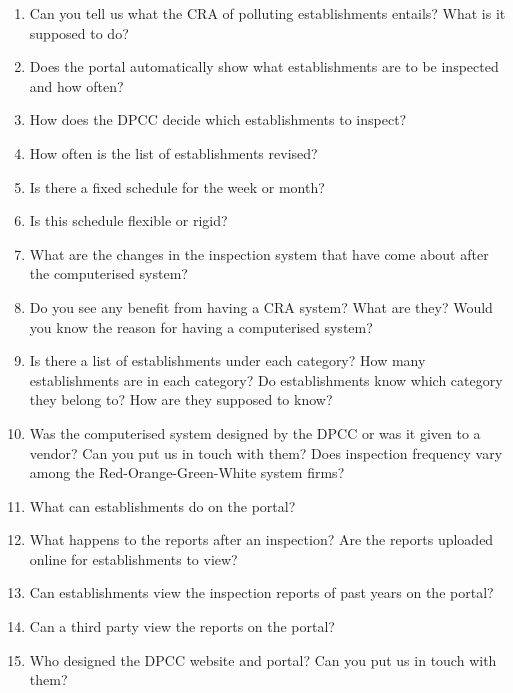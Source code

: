 \documentclass[a4paper, 12pt, twoside]{article}
\begin{document}
\begin{mdframed}[backgroundcolor=gray!20]
\begin{enumerate}
		\item{Can you tell us what the CRA of polluting establishments entails? What is it supposed to do?}
		\item{Does the portal automatically show what establishments are to be inspected and how often?}
		\item{How does the DPCC decide which establishments to inspect?}
		\item{How often is the list of establishments revised?}
		\item{Is there a fixed schedule for the week or month?}
		\item{Is this schedule flexible or rigid?}
		\item{What are the changes in the inspection system that have come about after the computerised system?}
		\item{Do you see any benefit from having a CRA system? What are they? Would you know the reason for having a computerised system?}
		\item{Is there a list of establishments under each category? How many establishments are in each category? Do establishments know which category they belong to? How are they supposed to know?}
		\item{Was the computerised system designed by the DPCC or was it given to a vendor? Can you put us in touch with them? Does inspection frequency vary among the Red-Orange-Green-White system firms?}
		\item{What can establishments do on the portal?}
		\item{What happens to the reports after an inspection? Are the reports uploaded online for establishments to view?}
		\item{Can establishments view the inspection reports of past years on the portal?}
		\item{Can a third party view the reports on the portal?}
		\item{Who designed the DPCC website and portal? Can you put us in touch with them?}
		\end{enumerate}
		\end{mdframed}
		
\end{document}
